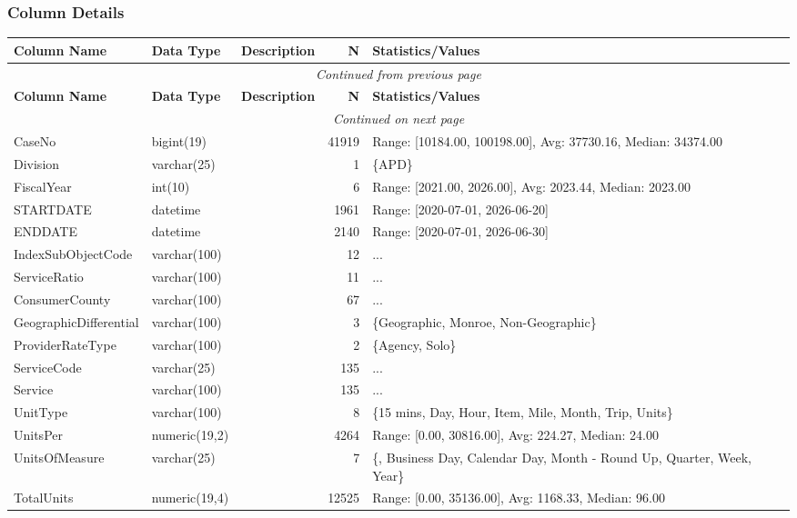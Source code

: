 \begin{landscape}
\subsubsection{Column Details}
\begin{longtable}{|l|l|l|r|p{6cm}|}
\hline
\textbf{Column Name} & \textbf{Data Type} & \textbf{Description} & \textbf{N} & \textbf{Statistics/Values} \\
\hline
\endfirsthead
\multicolumn{5}{c}{\textit{Continued from previous page}} \\
\hline
\textbf{Column Name} & \textbf{Data Type} & \textbf{Description} & \textbf{N} & \textbf{Statistics/Values} \\
\hline
\endhead
\hline
\multicolumn{5}{c}{\textit{Continued on next page}} \\
\endfoot
\hline
\endlastfoot
CaseNo & bigint(19) &  & 41919 & Range: [10184.00, 100198.00], Avg: 37730.16, Median: 34374.00 \\
\hline
Division & varchar(25) &  & 1 & \{APD\} \\
\hline
FiscalYear & int(10) &  & 6 & Range: [2021.00, 2026.00], Avg: 2023.44, Median: 2023.00 \\
\hline
STARTDATE & datetime &  & 1961 & Range: [2020-07-01, 2026-06-20] \\
\hline
ENDDATE & datetime &  & 2140 & Range: [2020-07-01, 2026-06-30] \\
\hline
IndexSubObjectCode & varchar(100) &  & 12 & ... \\
\hline
ServiceRatio & varchar(100) &  & 11 & ... \\
\hline
ConsumerCounty & varchar(100) &  & 67 & ... \\
\hline
GeographicDifferential & varchar(100) &  & 3 & \{Geographic, Monroe, Non-Geographic\} \\
\hline
ProviderRateType & varchar(100) &  & 2 & \{Agency, Solo\} \\
\hline
ServiceCode & varchar(25) &  & 135 & ... \\
\hline
Service & varchar(100) &  & 135 & ... \\
\hline
UnitType & varchar(100) &  & 8 & \{15 mins, Day, Hour, Item, Mile, Month, Trip, Units\} \\
\hline
UnitsPer & numeric(19,2) &  & 4264 & Range: [0.00, 30816.00], Avg: 224.27, Median: 24.00 \\
\hline
UnitsOfMeasure & varchar(25) &  & 7 & \{, Business Day, Calendar Day, Month - Round Up, Quarter, Week, Year\} \\
\hline
TotalUnits & numeric(19,4) &  & 12525 & Range: [0.00, 35136.00], Avg: 1168.33, Median: 96.00 \\

\end{longtable}
\end{landscape}
